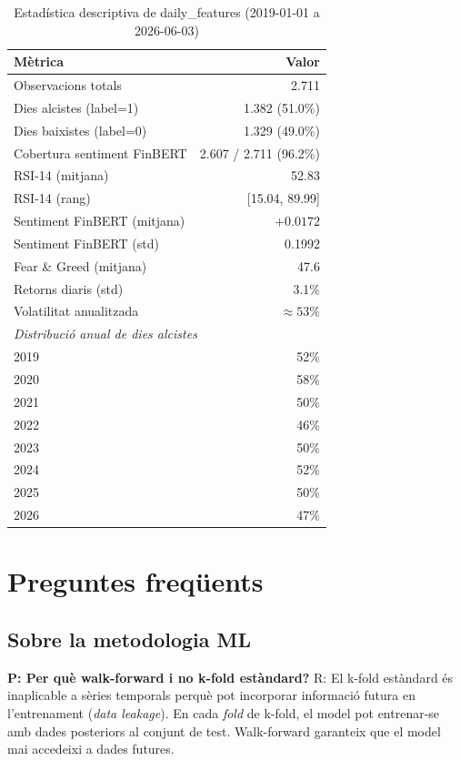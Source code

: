 \documentclass[12pt, a4paper]{report}
\begin{document}
\begin{table}[H]
\centering
\caption{Estadística descriptiva de daily\_features (2019-01-01 a 2026-06-03)}
\label{tab:estadistica}
\begin{tabular}{@{}lr@{}}
\toprule
\textbf{Mètrica} & \textbf{Valor} \\
\midrule
Observacions totals              & 2.711 \\
Dies alcistes (label=1)          & 1.382 (51.0\%) \\
Dies baixistes (label=0)         & 1.329 (49.0\%) \\
Cobertura sentiment FinBERT      & 2.607 / 2.711 (96.2\%) \\
RSI-14 (mitjana)                 & 52.83 \\
RSI-14 (rang)                    & [15.04, 89.99] \\
Sentiment FinBERT (mitjana)      & $+0.0172$ \\
Sentiment FinBERT (std)          & 0.1992 \\
Fear \& Greed (mitjana)          & 47.6 \\
Retorns diaris (std)             & 3.1\% \\
Volatilitat anualitzada          & $\approx 53\%$ \\
\midrule
\multicolumn{2}{l}{\textit{Distribució anual de dies alcistes}} \\
2019 & 52\% \\
2020 & 58\% \\
2021 & 50\% \\
2022 & 46\% \\
2023 & 50\% \\
2024 & 52\% \\
2025 & 50\% \\
2026 & 47\% \\
\bottomrule
\end{tabular}
\end{table}

\chapter{Preguntes freqüents }

\section*{Sobre la metodologia ML}

\textbf{P: Per què walk-forward i no k-fold estàndard?}
R: El k-fold estàndard és inaplicable a sèries temporals perquè pot incorporar informació futura en l'entrenament (\textit{data leakage}). En cada \textit{fold} de k-fold, el model pot entrenar-se amb dades posteriors al conjunt de test. Walk-forward garanteix que el model mai accedeixi a dades futures.
\end{document}
